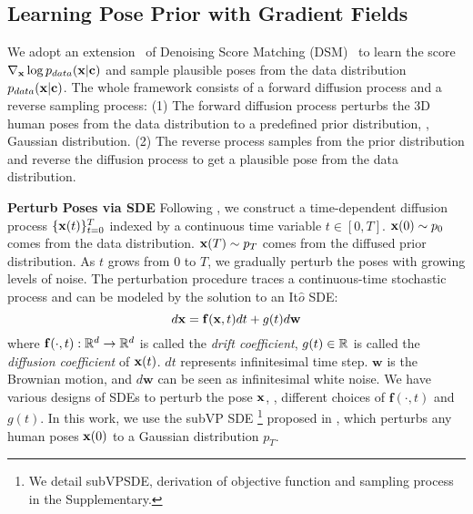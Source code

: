 \documentclass[10pt,twocolumn,letterpaper]{article}
\begin{document}
\subsection{Learning Pose Prior with Gradient Fields}
\label{sec:learn_gf}


We adopt an extension~\cite{song2020score} of Denoising Score Matching (DSM)~\cite{denosingScoreMatching} to learn the score $\nabla_{\mathbf{x}}\log p_{data}(\mathbf{x} | \mathbf{c} )$ and sample plausible poses from the data distribution $p_{data}(\mathbf{x}| \mathbf{c})$. 
The whole framework consists of a forward diffusion process and a reverse sampling process:
(1) The forward diffusion process perturbs the 3D human poses from the data distribution to a predefined prior distribution, \eg, Gaussian distribution.
(2) The reverse process samples from the prior distribution and reverse the diffusion process to get a plausible pose from the data distribution. 


\noindent
\textbf{Perturb Poses via SDE}
Following \cite{song2020score}, we construct a time-dependent diffusion process $\{ \mathbf{x} (t) \}^{T}_{t=0}$ indexed by a continuous time variable $t \in [0, T]$. $\mathbf{x}(0) \sim p_0$ comes from the data distribution.
 $\mathbf{x}(T) \sim p_T$ comes from the diffused prior distribution. As $t$ grows from $0$ to $T$, we gradually perturb the poses with growing levels of noise. The perturbation procedure traces a continuous-time stochastic process and can be modeled by the solution to an It$\hat{o}$ SDE:
\begin{equation}
    d\mathbf{x} = \mathbf{f}(\mathbf{x}, t) dt + g(t) d\mathbf{w}
\end{equation}
where $\mathbf{f}(\cdot, t): \mathbb{R}^d \to \mathbb{R}^d $ is called the \textit{drift coefficient}, $g(t) \in \mathbb{R}$ is called the \textit{diffusion coefficient} of $\mathbf{x}(t)$. $dt$ represents infinitesimal time step. $\mathbf{w}$ is the Brownian motion, and $d\mathbf{w}$ can be seen as infinitesimal white noise. We have various designs of SDEs to perturb the pose $\mathbf{x}$, \ie, different choices of $\mathbf{f}(\cdot, t)$ and $g(t)$. In this work, we use the subVP SDE 
\footnote{\label{footnote1}We detail subVPSDE, derivation of objective function and sampling process in the Supplementary.} 
proposed in \cite{song2020score}, which perturbs any human poses $\mathbf{x}(0)$ to a Gaussian distribution $p_T$. 
\end{document}
